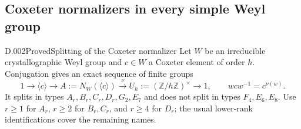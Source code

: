 \subsection{Coxeter normalizers in every simple Weyl group}
\begin{saresult}{D.002}{Proved}{Splitting of the Coxeter normalizer}
Let $W$ be an irreducible crystallographic Weyl group and $c\in W$ a
Coxeter element of order $h$.  Conjugation gives an exact sequence of finite
groups
\[
 1\longrightarrow\langle c\rangle\longrightarrow
 A:=N_W(\langle c\rangle)\xrightarrow{\nu}
 U_h:=(\mathbb Z/h\mathbb Z)^\times\longrightarrow1,
 \qquad wcw^{-1}=c^{\nu(w)}.
\]
It splits in types $A_r,B_r,C_r,D_r,G_2,E_7$ and does not split in
types $F_4,E_6,E_8$.  Use $r\ge1$ for $A_r$, $r\ge2$ for $B_r,C_r$,
and $r\ge4$ for $D_r$; the usual lower-rank identifications cover the
remaining names.
\end{saresult}
